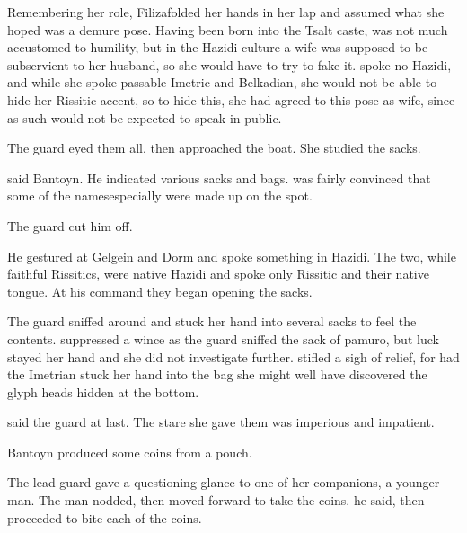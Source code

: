 Remembering her role, \Filgzed{}\dash{}Filiza\dash{}folded her hands in her lap and assumed what she hoped was a demure pose. Having been born into the Tsalt caste, \Filgzed{} was not much accustomed to humility, but in the Hazidi culture a wife was supposed to be subservient to her husband, so she would have to try to fake it. %
\Filgzed{} spoke no Hazidi, and while she spoke passable Imetric and Belkadian, she would not be able to hide her Rissitic accent, so to hide this, she had agreed to this pose as  wife, since as such  would not be expected to speak in public. 

The guard eyed them all, then approached the boat. She studied the sacks.  

 said Bantoyn.  He indicated various sacks and bags.  \Filgzed{} was fairly convinced that some of the names\dash{}especially \dash{}were made up on the spot. 

The guard cut him off.  

 He gestured at Gelgein and Dorm and spoke something in Hazidi. The two, while faithful Rissitics, were native Hazidi and spoke only Rissitic and their native tongue. At his command they began opening the sacks. 

The guard sniffed around and stuck her hand into several sacks to feel the contents. \Filgzed{} suppressed a wince as the guard sniffed the sack of pamuro, but luck stayed her hand and she did not investigate further. \Filgzed{} stifled a sigh of relief, for had the Imetrian stuck her hand into the bag she might well have discovered the glyph heads hidden at the bottom. 

 said the guard at last.  The stare she gave them was imperious and impatient. 

 Bantoyn produced some coins from a pouch.  

The lead guard gave a questioning glance to one of her companions, a younger man. The man nodded, then moved forward to take the coins.  he said, then proceeded to bite each of the coins. 

